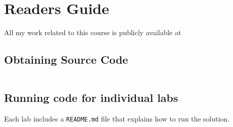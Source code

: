\section{Readers Guide}
All my work related to this course is publicly available at

\subsection{Obtaining Source Code}
\inputminted{sh}{code/obtaining-source.sh}

\subsection{Running code for individual labs}
Each lab includes a \texttt{README.md} file that explains how to run the solution.
